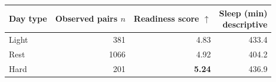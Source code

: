 \begingroup\small\setlength{\tabcolsep}{4pt}
\begin{tabular*}{\linewidth}{@{\extracolsep{\fill}}lrrr}
\toprule
Day type & \shortstack{Observed\\pairs $n$} & \shortstack{Readiness score\\$\uparrow$} & \shortstack{Sleep (min)\\descriptive}\\
\midrule
Light & 381 & 4.83 & 433.4\\
Rest & 1066 & 4.92 & 404.2\\
Hard & 201 & \textbf{5.24} & 436.9\\
\bottomrule
\end{tabular*}\endgroup

